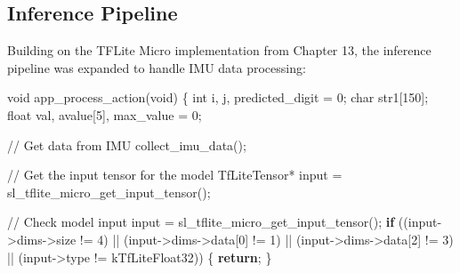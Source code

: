 \documentclass[
  9pt,
  letterpaper,
  abstract,
  titlepage]{scrbook}
\newenvironment{Shaded}{\begin{snugshade}}{\end{snugshade}}
\newcommand{\CommentTok}[1]{\textcolor[rgb]{0.37,0.37,0.37}{#1}}
\newcommand{\ControlFlowTok}[1]{\textcolor[rgb]{0.00,0.23,0.31}{\textbf{#1}}}
\newcommand{\DataTypeTok}[1]{\textcolor[rgb]{0.68,0.00,0.00}{#1}}
\newcommand{\DecValTok}[1]{\textcolor[rgb]{0.68,0.00,0.00}{#1}}
\newcommand{\NormalTok}[1]{\textcolor[rgb]{0.00,0.23,0.31}{#1}}
\newcommand{\OperatorTok}[1]{\textcolor[rgb]{0.37,0.37,0.37}{#1}}
\begin{document}
\subsection{Inference Pipeline}\label{inference-pipeline}

Building on the TFLite Micro implementation from Chapter 13, the
inference pipeline was expanded to handle IMU data processing:

\begin{Shaded}
\begin{Highlighting}[]
\DataTypeTok{void}\NormalTok{ app\_process\_action}\OperatorTok{(}\DataTypeTok{void}\OperatorTok{)}
\OperatorTok{\{}
  \DataTypeTok{int}\NormalTok{ i}\OperatorTok{,}\NormalTok{ j}\OperatorTok{,}\NormalTok{ predicted\_digit }\OperatorTok{=} \DecValTok{0}\OperatorTok{;}
  \DataTypeTok{char}\NormalTok{ str1}\OperatorTok{[}\DecValTok{150}\OperatorTok{];}
  \DataTypeTok{float}\NormalTok{ val}\OperatorTok{,}\NormalTok{ avalue}\OperatorTok{[}\DecValTok{5}\OperatorTok{],}\NormalTok{ max\_value }\OperatorTok{=} \DecValTok{0}\OperatorTok{;}

  \CommentTok{// Get data from IMU}
\NormalTok{  collect\_imu\_data}\OperatorTok{();}

  \CommentTok{// Get the input tensor for the model}
\NormalTok{  TfLiteTensor}\OperatorTok{*}\NormalTok{ input }\OperatorTok{=}\NormalTok{ sl\_tflite\_micro\_get\_input\_tensor}\OperatorTok{();}

  \CommentTok{// Check model input}
\NormalTok{  input }\OperatorTok{=}\NormalTok{ sl\_tflite\_micro\_get\_input\_tensor}\OperatorTok{();}
  \ControlFlowTok{if} \OperatorTok{((}\NormalTok{input}\OperatorTok{{-}\textgreater{}}\NormalTok{dims}\OperatorTok{{-}\textgreater{}}\NormalTok{size }\OperatorTok{!=} \DecValTok{4}\OperatorTok{)} \OperatorTok{||} \OperatorTok{(}\NormalTok{input}\OperatorTok{{-}\textgreater{}}\NormalTok{dims}\OperatorTok{{-}\textgreater{}}\NormalTok{data}\OperatorTok{[}\DecValTok{0}\OperatorTok{]} \OperatorTok{!=} \DecValTok{1}\OperatorTok{)}
        \OperatorTok{||} \OperatorTok{(}\NormalTok{input}\OperatorTok{{-}\textgreater{}}\NormalTok{dims}\OperatorTok{{-}\textgreater{}}\NormalTok{data}\OperatorTok{[}\DecValTok{2}\OperatorTok{]} \OperatorTok{!=} \DecValTok{3}\OperatorTok{)}
        \OperatorTok{||} \OperatorTok{(}\NormalTok{input}\OperatorTok{{-}\textgreater{}}\NormalTok{type }\OperatorTok{!=}\NormalTok{ kTfLiteFloat32}\OperatorTok{))} \OperatorTok{\{}
              \ControlFlowTok{return}\OperatorTok{;}
   \OperatorTok{\}}


\end{Highlighting}
\end{Shaded}
\end{document}
